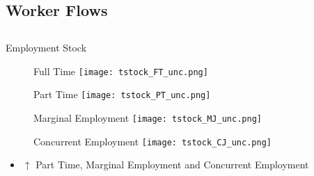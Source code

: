 \documentclass[hyperref={bookmarks=false}]{beamer}
\let\oldcite=\cite
\renewcommand{\cite}[1]{\textcolor[rgb]{.0,.2,.7}{\oldcite{#1}}}
\begin{document}
\begin{appendix}
\section{Worker Flows}
\subsection{}

\begin{frame}
\label{WFLOW}
\end{frame}



\begin{frame}{Employment Stock}
\begin{figure}[!t]
\centering
\begin{minipage}[b]{0.4\textwidth}{Full Time}
\centering
\texttt{[image: tstock\_FT\_unc.png]}
\end{minipage}
\begin{minipage}[b]{0.4\textwidth}{Part Time}
\centering
\texttt{[image: tstock\_PT\_unc.png]}
\end{minipage}
\begin{minipage}[b]{0.4\textwidth}{Marginal Employment}
\centering
\texttt{[image: tstock\_MJ\_unc.png]}
\end{minipage}
\begin{minipage}[b]{0.4\textwidth}{Concurrent Employment}
\centering
\texttt{[image: tstock\_CJ\_unc.png]}
\end{minipage}
\end{figure}
\begin{itemize}
\setlength{\itemsep}{0.7 cm}
\item $\uparrow$ Part Time, Marginal Employment and Concurrent Employment \cite{CarriTuRo15} 
\end{itemize}
\end{frame}


\end{appendix}
\end{document}
